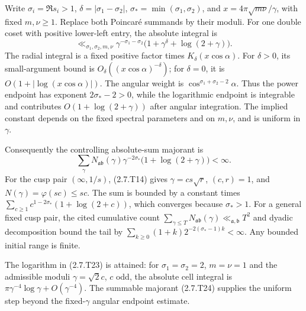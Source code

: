 Write $\sigma_i=\Re s_i>1$,
$\delta=|\sigma_1-\sigma_2|$,
$\sigma_*=\min(\sigma_1,\sigma_2)$, and
$x=4\pi\sqrt{m\nu}/\gamma$, with fixed $m,\nu\ge1$. Replace both Poincaré summands by their moduli. For one double coset with positive lower-left entry, the absolute integral is
\[
\ll_{\sigma_1,\sigma_2,m,\nu}
\gamma^{-\sigma_1-\sigma_2}
\bigl(1+\gamma^\delta+\log(2+\gamma)\bigr).
\tag{2.7.T23}\label{p1:eq:2.7.T23}
\]
The radial integral is a fixed positive factor times
$K_\delta(x\cos\alpha)$. For $\delta>0$, its small-argument
bound is $O_\delta((x\cos\alpha)^{-\delta})$; for $\delta=0$,
it is $O(1+|\log(x\cos\alpha)|)$. The angular weight is
$\cos^{\sigma_1+\sigma_2-2}\alpha$. Thus the power endpoint has
exponent $2\sigma_*-2>0$, while the logarithmic endpoint is
integrable and contributes $O(1+\log(2+\gamma))$ after angular
integration. The implied constant depends on the fixed spectral parameters and
on $m,\nu$, and is uniform in $\gamma$.

Consequently the controlling absolute-sum majorant is
\[
\sum_\gamma N_{\mathfrak a\mathfrak b}(\gamma)
\gamma^{-2\sigma_*}\bigl(1+\log(2+\gamma)\bigr)<\infty.
\tag{2.7.T24}\label{p1:eq:2.7.T24}
\]
For the cusp pair $(\infty,1/s)$, (2.7.T14) gives
$\gamma=cs\sqrt r$, $(c,r)=1$, and
$N(\gamma)=\varphi(sc)\le sc$. The sum is bounded by a constant
times
$\sum_{c\ge1}c^{1-2\sigma_*}(1+\log(2+c))$, which converges
because $\sigma_*>1$. For a general fixed cusp pair, the cited
cumulative count
$\sum_{\gamma\le T}N_{\mathfrak a\mathfrak b}(\gamma)
\ll_{\mathfrak a,\mathfrak b}T^2$ and dyadic decomposition bound
the tail by
$\sum_{k\ge0}(1+k)2^{-2(\sigma_*-1)k}<\infty$. Any bounded
initial range is finite.

The logarithm in (2.7.T23) is attained: for $\sigma_1=\sigma_2=2$, $m=\nu=1$ and the admissible moduli $\gamma=\sqrt2 c$, $c$ odd, the absolute cell integral is $\pi\gamma^{-4}\log\gamma+O(\gamma^{-4})$. The summable majorant (2.7.T24) supplies the uniform step beyond the fixed-$\gamma$ angular endpoint estimate.

